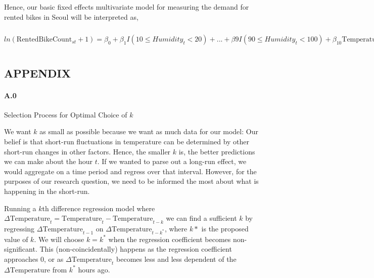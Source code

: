 \documentclass[
  letterpaper,
  DIV=11,
  numbers=noendperiod]{scrartcl}
\let\oldparagraph\paragraph
\renewcommand{\paragraph}[1]{\oldparagraph{#1}\mbox{}}
\begin{document}
Hence, our basic fixed effects multivariate model for measuring the
demand for rented bikes in Seoul will be interpreted as,

\(ln(\text{RentedBikeCount}_{st}+1) = \beta_0 + \beta_1I(10 \leq Humidity_t < 20) + ... + \beta9I(90 \leq Humidity_t < 100) + \beta_{10}\text{Temperature}_{st} + \beta_{11}\text{WindSpeed}_{st} + \beta_{12}(-\sqrt{\text{Visibility}_{st}}) + \beta_{13}I(\text{ExtremeWind}_{st} = \text{Yes}) + \beta_{14}\text{DewPointTemp}_{st} + \beta_{15}\text{SolarRadiation}_{st} + \beta_{16}\text{Rainfall}_{st} + \beta_{17}\text{Snowfall}_{st} + \beta_{18}I(\text{Day}_t = Holiday) + \beta_{19}I(\text{Hour}_t = 1) + ... + \beta_{41}I(\text{Hour}_t = 23) + \beta_{42}I(\text{Season}_s = Winter) + \beta_{43}I(\text{Season}_s = Summer) + \beta_{44}I(\text{Season}_s = Autumn) + \eta_{st}\)

\hypertarget{appendix}{%
\subsection{APPENDIX}\label{appendix}}

\hypertarget{a0}{%
\paragraph{A.0}\label{a0}}

Selection Process for Optimal Choice of \(k\)

We want \(k\) as small as possible because we want as much data for our
model: Our belief is that short-run fluctuations in temperature can be
determined by other short-run changes in other factors. Hence, the
smaller \(k\) is, the better predictions we can make about the hour
\(t\). If we wanted to parse out a long-run effect, we would aggregate
on a time period and regress over that interval. However, for the
purposes of our research question, we need to be informed the most about
what is happening in the short-run.

Running a \(k\)th difference regression model where
\(\Delta\text{Temperature}_t = \text{Temperature}_t - \text{Temperature}_{t-k}\)
we can find a sufficient \(k\) by regressing
\(\Delta\text{Temperature}_{t-1}\) on
\(\Delta\text{Temperature}_{t-k^*}\), where \(k*\) is the proposed value
of \(k\). We will choose \(k=k^*\) when the regression coefficient
becomes non-significant. This (non-coincidentally) happens as the
regression coefficient approaches 0, or as
\(\Delta\text{Temperature}_t\) becomes less and less dependent of the
\(\Delta\text{Temperature}\) from \(k^*\) hours ago.
\end{document}

